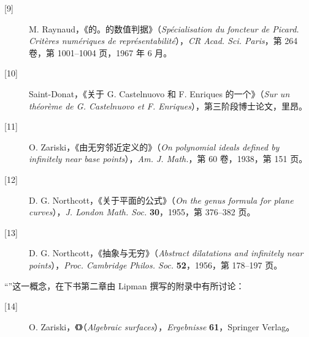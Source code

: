 \begin{description}
\item[{[9]}] M. Raynaud，《的。的数值判据》（\textit{Spécialisation du foncteur de Picard. Critères numériques de représentabilité}），\textit{CR Acad. Sci. Paris}，第 264 卷，第 1001--1004 页，1967 年 6 月。
\item[{[10]}] Saint-Donat，《关于 G. Castelnuovo 和 F. Enriques 的一个》（\textit{Sur un théorème de G. Castelnuovo et F. Enriques}），第三阶段博士论文，里昂。
\item[{[11]}] O. Zariski，《由无穷邻近定义的》（\textit{On polynomial ideals defined by infinitely near base points}），\textit{Am. J. Math.}，第 60 卷，1938，第 151 页。
\item[{[12]}] D. G. Northcott，《关于平面的公式》（\textit{On the genus formula for plane curves}），\textit{J. London Math. Soc.} \textbf{30}，1955，第 376--382 页。
\item[{[13]}] D. G. Northcott，《抽象与无穷》（\textit{Abstract dilatations and infinitely near points}），\textit{Proc. Cambridge Philos. Soc.} \textbf{52}，1956，第 178--197 页。
\end{description}
“”这一概念，在下书第二章由 Lipman 撰写的附录中有所讨论：
\begin{description}
\item[{[14]}] O. Zariski，《》（\textit{Algebraic surfaces}），\textit{Ergebnisse} \textbf{61}，Springer Verlag。
\end{description}
